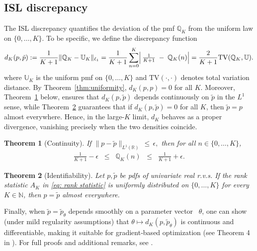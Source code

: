 \documentclass{article}
\newtheorem{theorem}{Theorem}[section]
\begin{document}
\subsection{ISL discrepancy}\label{sec:loss}
The ISL discrepancy quantifies the deviation of the pmf $\mathbb{Q}_{K}$ from the uniform law on $\{0,\dots,K\}$. To be specific, we define the discrepancy function
\begin{align}\label{eq:dK}
d_{K}(p,\tilde{p})
:= \dfrac{1}{K+1}\|\mathbb{Q}_{K} - \mathbb{U}_{K}\|_{\ell_{1}}= 
\frac{1}{K+1}\sum_{n=0}^{K}
\Bigl|\,
\tfrac{1}{K+1} 
\;-\; 
\mathbb{Q}_{K}(n)
\Bigr|= \dfrac{2}{K+1} \mathrm{TV}(\mathbb{Q}_{K}, \mathbb{U}).
\end{align}
where $\mathbb U_K$ is the uniform pmf on $\{0,\dots,K\}$ and $\mathrm{TV}(\cdot,\cdot)$ denotes total variation distance.
By Theorem~\ref{thm:uniformity}, $d_K(p,p)=0$ for all $K$.  Moreover, Theorem~\ref{thm:continuity} below, ensures that \(d_K(p,\tilde p)\) depends continuously on \(\tilde p\) in the \(L^1\) sense, while Theorem~\ref{thm:identifiability} guarantees that if \(d_K(p,\tilde p)=0\) for all \(K\), then \(\tilde p=p\) almost everywhere.  Hence, in the large-\(K\) limit, \(d_K\) behaves as a proper divergence, vanishing precisely when the two densities coincide.

\begin{theorem}[Continuity]\label{thm:continuity}
If $\|p - \tilde{p}\|_{L^1(\mathbb{R})}\,\le\,\epsilon,$ then for all $n\in \{0,\ldots,K\}$,
\begin{align*}
 \frac{1}{K+1}-\epsilon
 \;\;\le\;\;
 \mathbb{Q}_{K}(n)
 \;\;\le\;\;
 \frac{1}{K+1}+\epsilon.
\end{align*}
\end{theorem}

\begin{theorem}[Identifiability]\label{thm:identifiability}
Let $p,\tilde{p}$ be pdfs of univariate real r.v.s. If the rank statistic $A_{K}$ in \eqref{eq: rank statistic} is uniformly distributed on $\{0,\ldots,K\}$ for \emph{every} $K\in \mathbb{N}$, then $p=\tilde{p}$ almost everywhere.
\end{theorem}

Finally, when $\tilde p=\tilde p_\theta$ depends smoothly on a parameter vector ~$\theta$, one can show (under mild regularity assumptions) that $\theta\mapsto d_K(p,\tilde p_\theta)$ is continuous and differentiable, making it suitable for gradient‐based optimization (see Theorem 4 in \cite{de2024robust}). For full proofs and additional remarks, see \cite{de2024training,de2024robust}.  
\end{document}
